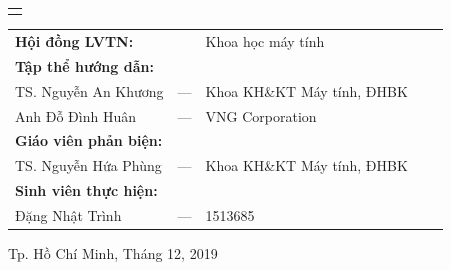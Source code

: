 \documentclass[a4paper,13pt]{report}
\begin{document}
\begin{titlepage}
\begin{center}
\begin{tabular}{c}
\\
\hline
\\

\end{tabular}
\end{center}

\vspace{1cm}

\begin{tabular}{lllll}
\hspace{3 cm} \textbf{Hội đồng LVTN:}& &Khoa học máy tính\\\addlinespace

\hspace{3 cm} \textbf{Tập thể hướng dẫn:}\\\addlinespace
\hspace{4 cm} TS. Nguyễn An Khương &---& Khoa KH\&KT Máy tính, ĐHBK  \\
\hspace{4 cm} Anh Đỗ Đình Huân &---& VNG Corporation \\\addlinespace

\hspace{3 cm} \textbf{Giáo viên phản biện:}\\\addlinespace
\hspace{4 cm} TS. Nguyễn Hứa Phùng &---& Khoa KH\&KT Máy tính, ĐHBK  \\\addlinespace

\hspace{3 cm} \textbf{Sinh viên thực hiện:} \\\addlinespace
\hspace{4 cm} Đặng Nhật Trình &---& 1513685 \\

\end{tabular}

\vspace{1.5cm}

\begin{center}
{\footnotesize Tp. Hồ Chí Minh, Tháng 12, 2019}
\end{center}
\end{titlepage}

\preface


% 
% 


\body
\printglossary[type=\acronymtype, title=Danh mục viết tắt, toctitle=Danh mục viết tắt]












\appendix


% 
% 
% 

\printbibliography
\end{document}
